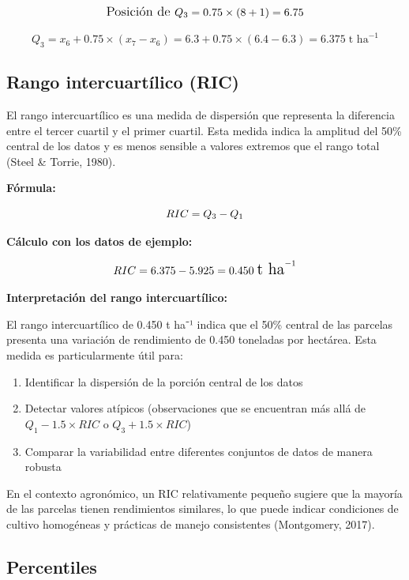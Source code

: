 \documentclass[
  spanish,
  letterpaper,
]{book}
\providecommand{\tightlist}{%
  \setlength{\itemsep}{0pt}\setlength{\parskip}{0pt}}
\begin{document}
\[\large\text{Posición de } Q_3 = 0.75 \times (8+1) = 6.75\]

\[Q_3 = x_6 + 0.75 \times (x_7 - x_6) = 6.3 + 0.75 \times (6.4 - 6.3) = 6.375\; \text{t ha}^{-1}\]

\subsection{Rango intercuartílico
(RIC)}\label{rango-intercuartuxedlico-ric}

El rango intercuartílico es una medida de dispersión que representa la
diferencia entre el tercer cuartil y el primer cuartil. Esta medida
indica la amplitud del 50\% central de los datos y es menos sensible a
valores extremos que el rango total (Steel \& Torrie, 1980).

\textbf{Fórmula:}

\[\huge RIC = Q_3 - Q_1\]

\textbf{Cálculo con los datos de ejemplo:}

\[\Large RIC = 6.375 - 5.925 = 0.450\; \text{t ha}^{-1}\]

\textbf{Interpretación del rango intercuartílico:}

El rango intercuartílico de 0.450 t ha⁻¹ indica que el 50\% central de
las parcelas presenta una variación de rendimiento de 0.450 toneladas
por hectárea. Esta medida es particularmente útil para:

\begin{enumerate}
\def\labelenumi{\arabic{enumi}.}
\tightlist
\item
  Identificar la dispersión de la porción central de los datos
\item
  Detectar valores atípicos (observaciones que se encuentran más allá de
  \(Q_1 - 1.5 \times RIC\) o \(Q_3 + 1.5 \times RIC\))
\item
  Comparar la variabilidad entre diferentes conjuntos de datos de manera
  robusta
\end{enumerate}

En el contexto agronómico, un RIC relativamente pequeño sugiere que la
mayoría de las parcelas tienen rendimientos similares, lo que puede
indicar condiciones de cultivo homogéneas y prácticas de manejo
consistentes (Montgomery, 2017).

\subsection{Percentiles}\label{percentiles}
\end{document}

